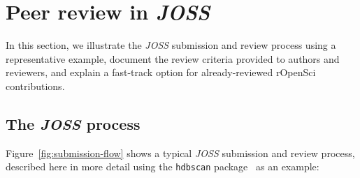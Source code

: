 \documentclass{article}
\newcommand\joss{\textit{JOSS}}
\begin{document}
\section{Peer review in \joss{}}
\label{thereview}

In this section, we illustrate the \joss{} submission and review process using a representative example, document the review criteria provided to authors and reviewers, and explain a fast-track option for already-reviewed rOpenSci contributions.


\subsection{The \joss{} process}

Figure~\ref{fig:submission-flow} shows a typical \joss{} submission and review process, described here in more detail using the \texttt{hdbscan} package~\cite{McInnes2017} as an example:
\end{document}
